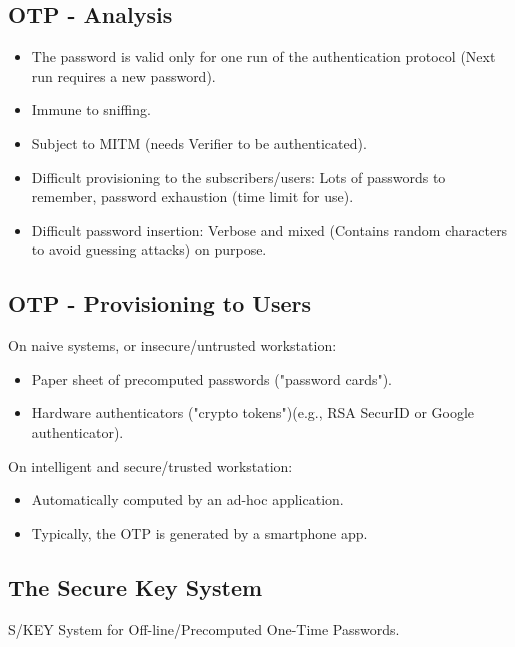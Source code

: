 \clearpage
\subsection*{OTP - Analysis}
\begin{itemize}
    \item The password is valid only for one run of the authentication protocol (Next run requires a new password).
    \item Immune to sniffing.
    \item Subject to MITM (needs Verifier to be authenticated).
    \item Difficult provisioning to the subscribers/users: Lots of passwords to remember, password exhaustion (time limit for use).
    \item Difficult password insertion: Verbose and mixed (Contains random characters to avoid guessing attacks) on purpose.
\end{itemize}

\subsection*{OTP - Provisioning to Users}
On naive systems, or insecure/untrusted workstation:
\begin{itemize}
    \item Paper sheet of precomputed passwords ("password cards").
    \item Hardware authenticators ("crypto tokens")(e.g., RSA SecurID or Google authenticator).
\end{itemize}
On intelligent and secure/trusted workstation:
\begin{itemize}
    \item Automatically computed by an ad-hoc application.
    \item Typically, the OTP is generated by a smartphone app.
\end{itemize}

\subsection{The Secure Key System}
\begin{center}
    S/KEY System for Off-line/Precomputed One-Time Passwords.
\end{center}

